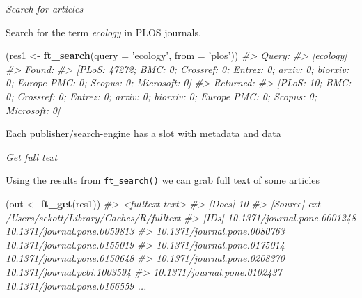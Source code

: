 \documentclass[author-year, review, 11pt]{components/elsarticle} %
\newenvironment{Shaded}{\begin{snugshade}}{\end{snugshade}}
\newcommand{\CommentTok}[1]{\textcolor[rgb]{0.56,0.35,0.01}{\textit{#1}}}
\newcommand{\DataTypeTok}[1]{\textcolor[rgb]{0.13,0.29,0.53}{#1}}
\newcommand{\KeywordTok}[1]{\textcolor[rgb]{0.13,0.29,0.53}{\textbf{#1}}}
\newcommand{\NormalTok}[1]{#1}
\newcommand{\OperatorTok}[1]{\textcolor[rgb]{0.81,0.36,0.00}{\textbf{#1}}}
\newcommand{\StringTok}[1]{\textcolor[rgb]{0.31,0.60,0.02}{#1}}
\begin{document}
\emph{Search for articles}

Search for the term \emph{ecology} in PLOS journals.

\begin{Shaded}
\begin{Highlighting}[]
\NormalTok{(res1 <-}\StringTok{ }\KeywordTok{ft_search}\NormalTok{(}\DataTypeTok{query =} \StringTok{'ecology'}\NormalTok{, }\DataTypeTok{from =} \StringTok{'plos'}\NormalTok{))}
\CommentTok{#> Query:}
\CommentTok{#>   [ecology] }
\CommentTok{#> Found:}
\CommentTok{#>   [PLoS: 47272; BMC: 0; Crossref: 0; Entrez: 0; arxiv: 0; biorxiv: 0; Europe PMC: 0; Scopus: 0; Microsoft: 0] }
\CommentTok{#> Returned:}
\CommentTok{#>   [PLoS: 10; BMC: 0; Crossref: 0; Entrez: 0; arxiv: 0; biorxiv: 0; Europe PMC: 0; Scopus: 0; Microsoft: 0]}
\end{Highlighting}
\end{Shaded}

Each publisher/search-engine has a slot with metadata and data

\begin{Shaded}
\end{Shaded}

\emph{Get full text}

Using the results from \texttt{ft\_search()} we can grab full text of
some articles

\begin{Shaded}
\begin{Highlighting}[]
\NormalTok{(out <-}\StringTok{ }\KeywordTok{ft_get}\NormalTok{(res1))}
\CommentTok{#> <fulltext text>}
\CommentTok{#> [Docs] 10 }
\CommentTok{#> [Source] ext - /Users/sckott/Library/Caches/R/fulltext }
\CommentTok{#> [IDs] 10.1371/journal.pone.0001248 10.1371/journal.pone.0059813}
\CommentTok{#>      10.1371/journal.pone.0080763 10.1371/journal.pone.0155019}
\CommentTok{#>      10.1371/journal.pone.0175014 10.1371/journal.pone.0150648}
\CommentTok{#>      10.1371/journal.pone.0208370 10.1371/journal.pcbi.1003594}
\CommentTok{#>      10.1371/journal.pone.0102437 10.1371/journal.pone.0166559 ...}
\end{Highlighting}
\end{Shaded}
\end{document}
